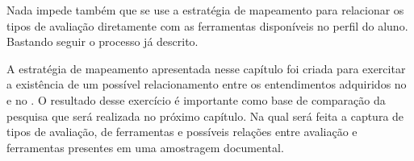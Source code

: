 Nada impede também que se use a estratégia de mapeamento para relacionar os tipos de avaliação diretamente com as ferramentas disponíveis no perfil do aluno. Bastando seguir o processo já descrito.

A estratégia de mapeamento apresentada nesse capítulo foi criada para exercitar a existência de um possível relacionamento entre os entendimentos adquiridos no  e no . O resultado desse exercício é importante como base de comparação da pesquisa que será realizada no próximo capítulo. Na qual será feita a captura de tipos de avaliação, de ferramentas e possíveis relações entre avaliação e ferramentas presentes em uma amostragem documental.


